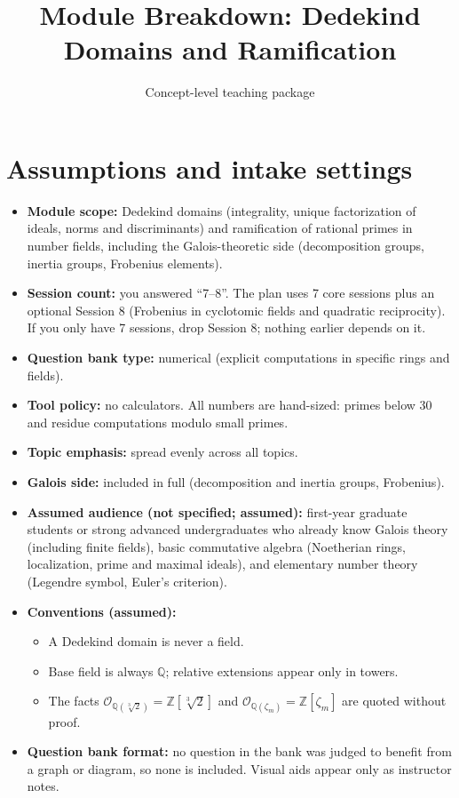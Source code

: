 \documentclass[11pt]{article}
\title{Module Breakdown: Dedekind Domains and Ramification}
\author{Concept-level teaching package}
\date{}
\newcommand{\Z}{\mathbb{Z}}
\newcommand{\Q}{\mathbb{Q}}
\newcommand{\cO}{\mathcal{O}}
\begin{document}
\maketitle
\tableofcontents

\section*{Assumptions and intake settings}

\begin{itemize}
  \item \textbf{Module scope:} Dedekind domains (integrality, unique factorization of ideals, norms and discriminants) and ramification of rational primes in number fields, including the Galois-theoretic side (decomposition groups, inertia groups, Frobenius elements).
  \item \textbf{Session count:} you answered ``7--8''. The plan uses 7 core sessions plus an optional Session 8 (Frobenius in cyclotomic fields and quadratic reciprocity). If you only have 7 sessions, drop Session 8; nothing earlier depends on it.
  \item \textbf{Question bank type:} numerical (explicit computations in specific rings and fields).
  \item \textbf{Tool policy:} no calculators. All numbers are hand-sized: primes below 30 and residue computations modulo small primes.
  \item \textbf{Topic emphasis:} spread evenly across all topics.
  \item \textbf{Galois side:} included in full (decomposition and inertia groups, Frobenius).
  \item \textbf{Assumed audience (not specified; assumed):} first-year graduate students or strong advanced undergraduates who already know Galois theory (including finite fields), basic commutative algebra (Noetherian rings, localization, prime and maximal ideals), and elementary number theory (Legendre symbol, Euler's criterion).
  \item \textbf{Conventions (assumed):}
  \begin{itemize}
    \item A Dedekind domain is never a field.
    \item Base field is always $\Q$; relative extensions appear only in towers.
    \item The facts $\cO_{\Q(\sqrt[3]{2})}=\Z[\sqrt[3]{2}]$ and $\cO_{\Q(\zeta_m)}=\Z[\zeta_m]$ are quoted without proof.
  \end{itemize}
  \item \textbf{Question bank format:} no question in the bank was judged to benefit from a graph or diagram, so none is included. Visual aids appear only as instructor notes.
\end{itemize}
\end{document}
